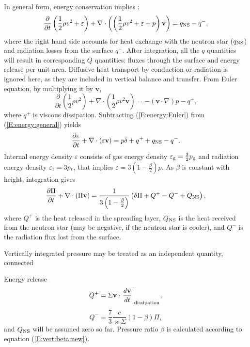 \documentclass[usenatbib,onecolumn]{mnras}
\renewcommand{\vector}[1]{\ensuremath{\mathbf{#1}}}
\newcommand{\pardir}[2]{\ensuremath{\frac{\partial #2}{\partial #1} }}
\newcommand{\ppardir}[2]{\ensuremath{\frac{\partial }{\partial #1} \left( #2\right)}}
\begin{document}
In general form, energy conservation implies \citep{SP06}:
\begin{equation}\label{E:energy:general}
\ppardir{t}{\frac{1}{2}\rho v^2 + \varepsilon}+\nabla \cdot \left(
\left(\frac{1}{2}\rho v^2 + \varepsilon + p \right)
\vector{v}\right) = q_{\rm NS} - q^{-},
\end{equation}
where the right hand side accounts for heat exchange with the neutron star ($q_{\rm NS}$) and radiation losses from the surface
$q^{-}$. After integration, all the $q$ quantities will result in
corresponding $Q$ quantities: fluxes through the surface and energy release
per unit area.
Diffusive heat transport by conduction or radiation is ignored here,
as they are included in vertical balance and transfer.
From Euler equation, by multiplying it by $\vector{v}$,
\begin{equation}\label{E:energy:Euler}
  \ppardir{t}{\frac{1}{2}\rho v^2}+\nabla \cdot \left(\frac{1}{2}\rho v^2
  \vector{v}\right) = -(\vector{v} \cdot \nabla) p - q^+,
\end{equation}
where $q^+$ is viscous dissipation. Subtracting (\ref{E:energy:Euler}) from
(\ref{E:energy:general}) yields
\begin{equation}\label{E:energy:thermal}
\pardir{t}{\varepsilon} + \nabla \cdot \left( \varepsilon \vector{v}\right) =
p \delta + q^+ + q_{\rm NS} - q^-.
\end{equation}
Internal energy density $\varepsilon$ consists of gas energy density
$\varepsilon_{\rm g} = \frac{3}{2} p_{\rm g}$ and radiation energy density
$\varepsilon_{\rm r} = 3 p_{\rm r}$, that implies $\varepsilon = 3\left(
1-\frac{\beta}{2}\right) p$. As $\beta$ is constant with height, integration
gives
\begin{equation}\label{E:energy:Pi}
\pardir{t}{\Pi} + \nabla \cdot \left( \Pi \vector{v}\right) = \frac{1}{3\left(
  1-\frac{\beta}{2}\right)} \left(\delta \Pi + Q^+ - Q^- + Q_{\rm NS}\right),
\end{equation}
where $Q^+$ is the heat released in the spreading layer, $Q_{\rm NS}$ is the
heat received from the neutron star (may be negative, if the neutron star is
cooler), and $Q^-$ is the radiation flux lost from the surface.

Vertically integrated pressure may be treated as an independent quantity,
connected

Energy release
\begin{equation}\label{E:energy:qplus}
Q^+ = \Sigma \vector{v} \cdot \left.\frac{d\vector{v}}{dt}\right|_{\rm dissipation},
\end{equation}
\begin{equation}\label{E:energy:qminus}
Q^- = \frac{7}{3} \frac{c}{\varkappa \Sigma}(1-\beta) \Pi,
\end{equation}
and $Q_{\rm NS}$ will be assumed zero so far. Pressure ratio $\beta$ is
calculated according to equation (\ref{E:vert:beta:new}).
\end{document}
